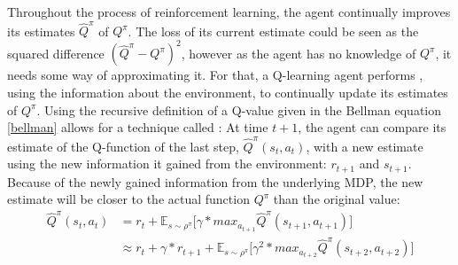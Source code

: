 

Throughout the process of reinforcement learning, the agent continually improves its estimates $\hat{Q}^\pi$ of $Q^\pi$. The loss of its current estimate could be seen as the squared difference $(\hat{Q}^\pi - Q^\pi)^2$, however as the agent has no knowledge of $Q^\pi$, it needs some way of approximating it. For that, a Q-learning agent performs , using the information about the environment, to continually update its estimates of $Q^\pi$.
\noindent Using the recursive definition of a Q-value given in the Bellman equation \ref{bellman} allows for a technique called \cite{sutton_learning_1988}: At time $t+1$, the agent can compare its estimate of the Q-function of the last step, $\hat{Q}^\pi(s_t, a_t)$, with a new estimate using the new information it gained from the environment: $r_{t+1}$ and $s_{t+1}$.  Because of the newly gained information from the underlying MDP, the new estimate will be closer to the actual function $Q^\pi$ than the original value:
\begin{align} 
	\hat{Q}^\pi(s_t,a_t) &= r_t + \mathds{E}_{s\sim\rho^\pi} \big[ \gamma * max_{a_{t+1}} \hat{Q}^\pi(s_{t+1},a_{t+1})  \big]\\
	                     &\approx r_t + \gamma * r_{t+1} + \mathds{E}_{s\sim\rho^\pi} \big[ \gamma^2 * max_{a_{t+2}} \hat{Q}^\pi(s_{t+2},a_{t+2})  \big] \label{bellmanmal2}
\end{align}

